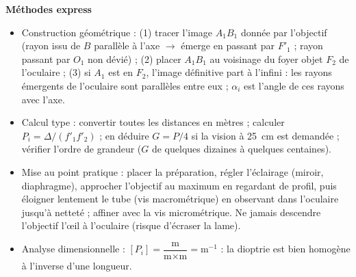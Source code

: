 \documentclass[11pt]{article}
\newcommand{\cle}[1]{{\popxbold\color{popdark}#1}}
\begin{document}
\begin{aretenir}
\textbf{M\'ethodes express}
\begin{itemize}
  \item \cle{Construction g\'eom\'etrique} : (1) tracer l'image $A_1B_1$ donn\'ee par l'objectif (rayon issu de $B$ parall\`ele \`a l'axe $\to$ \'emerge en passant par $F'_1$ ; rayon passant par $O_1$ non d\'evi\'e) ; (2) placer $A_1B_1$ au voisinage du foyer objet $F_2$ de l'oculaire ; (3) si $A_1$ est en $F_2$, l'image d\'efinitive part \`a l'infini : les rayons \'emergents de l'oculaire sont parall\`eles entre eux ; $\alpha_i$ est l'angle de ces rayons avec l'axe.
  \item \cle{Calcul type} : convertir toutes les distances en m\`etres ; calculer $P_i = \Delta/(f'_1 f'_2)$ ; en d\'eduire $G = P/4$ si la vision \`a \SI{25}{cm} est demand\'ee ; v\'erifier l'ordre de grandeur ($G$ de quelques dizaines \`a quelques centaines).
  \item \cle{Mise au point pratique} : placer la pr\'eparation, r\'egler l'\'eclairage (miroir, diaphragme), approcher l'objectif au maximum en regardant de profil, puis \'eloigner lentement le tube (vis macrom\'etrique) en observant dans l'oculaire jusqu'\`a nettet\'e ; affiner avec la vis microm\'etrique. Ne jamais descendre l'objectif l'\oe il \`a l'oculaire (risque d'\'ecraser la lame).
  \item \cle{Analyse dimensionnelle} : $[P_i] = \dfrac{\text{m}}{\text{m}\times\text{m}} = \text{m}^{-1}$ : la dioptrie est bien homog\`ene \`a l'inverse d'une longueur.
\end{itemize}
\end{aretenir}
\end{document}
